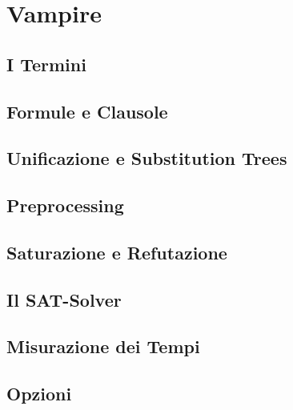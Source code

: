 \documentclass[./main.tex]{subfiles}
\begin{document}
\chapter{Vampire}

\section{I Termini}
\section{Formule e Clausole}
\section{Unificazione e Substitution Trees} 
\section{Preprocessing}
\section{Saturazione e Refutazione}
\section{Il SAT-Solver}
\section{Misurazione dei Tempi}
\section{Opzioni}
\end{document}
